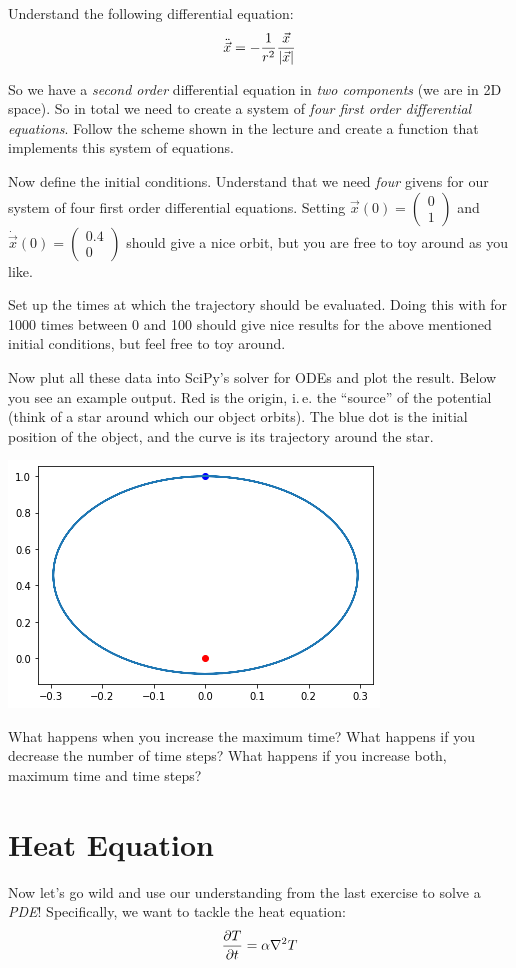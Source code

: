 \documentclass[
	english,
	fontsize=10pt,
	parskip=half,
	titlepage=true,
	DIV=12
]{scrartcl}
\newcommand*{\ie}{i.\,e. }
\begin{document}
Understand the following differential equation:
\[ \ddot{\vec{x}} = -\frac{1}{r^2} \frac{\vec{x}}{\abs{\vec{x}}} \]

So we have a \emph{second order} differential equation in \emph{two components} (we are in 2D space). So in total we need to create a system of \emph{four first order differential equations}. Follow the scheme shown in the lecture and create a function that implements this system of equations.

Now define the initial conditions. Understand that we need \emph{four} givens for our system of four first order differential equations. Setting 
$\vec{x}(0) = \begin{pmatrix}
	0 \\ 1
\end{pmatrix}$
and
$\dot{\vec{x}}(0) = \begin{pmatrix}
	0.4 \\ 0
\end{pmatrix}$
should give a nice orbit, but you are free to toy around as you like.

Set up the times at which the trajectory should be evaluated. Doing this with for 1000 times between 0 and 100 should give nice results for the above mentioned initial conditions, but feel free to toy around.

Now plut all these data into SciPy's solver for ODEs and plot the result. Below you see an example output. Red is the origin, \ie the \enquote{source} of the potential (think of a star around which our object orbits). The blue dot is the initial position of the object, and the curve is its trajectory around the star.
\begin{center}
	\includegraphics[width=.4\linewidth]{./orbit-example}
\end{center}

What happens when you increase the maximum time? What happens if you decrease the number of time steps? What happens if you increase both, maximum time and time steps?

\section{Heat Equation}
Now let's go wild and use our understanding from the last exercise to solve a \emph{PDE}! Specifically, we want to tackle the heat equation:
\[ \pdv{T}{t} = \alpha \laplacian T \]
\end{document}

